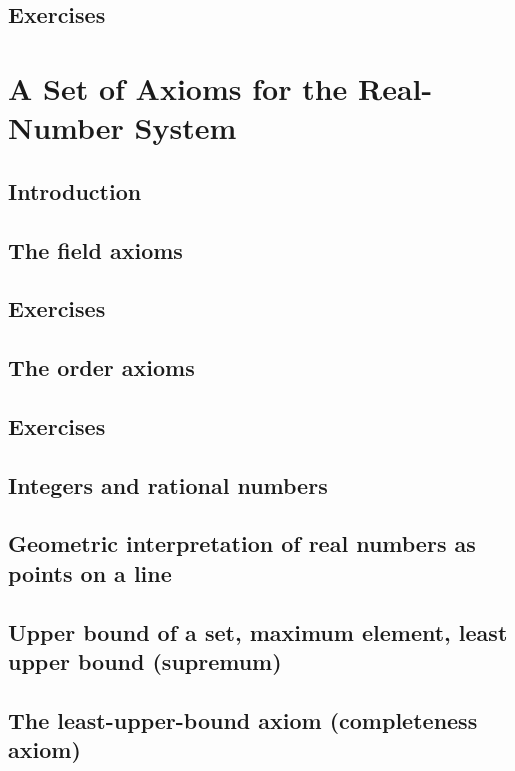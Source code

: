 \documentclass[cn,11pt,chinese]{elegantbook}
\numberwithin{equation}{section}
\begin{document}
\subsection{Exercises}


\section{A Set of Axioms for the Real-Number System}\label{section00103}


\subsection{Introduction}


\subsection{The field axioms}


\subsection{Exercises}


\subsection{The order axioms}


\subsection{Exercises}


\subsection{Integers and rational numbers}



\subsection{Geometric interpretation of real numbers as points on a line}


\subsection{Upper bound of a set, maximum element, least upper bound (supremum)}


\subsection{The least-upper-bound axiom (completeness axiom)}
\end{document}

